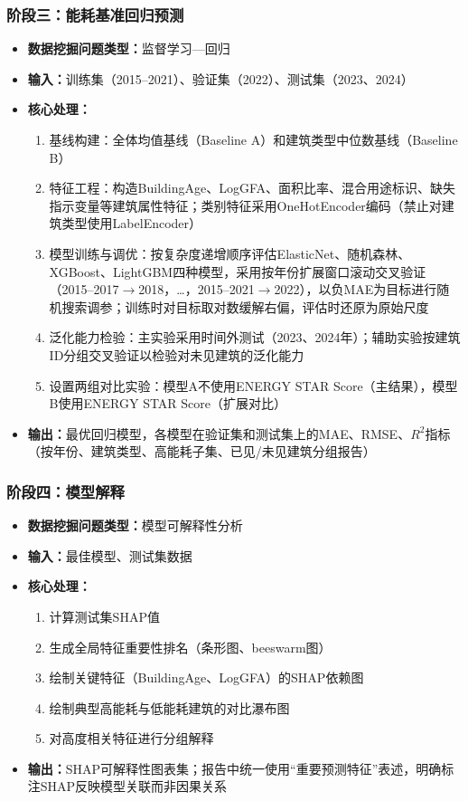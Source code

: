 \subsubsection{阶段三：能耗基准回归预测}

\begin{itemize}
    \item \textbf{数据挖掘问题类型：}监督学习—回归
    \item \textbf{输入：}训练集（2015--2021）、验证集（2022）、测试集（2023、2024）
    \item \textbf{核心处理：}
    \begin{enumerate}
        \item 基线构建：全体均值基线（Baseline A）和建筑类型中位数基线（Baseline B）
        \item 特征工程：构造BuildingAge、LogGFA、面积比率、混合用途标识、缺失指示变量等建筑属性特征；类别特征采用OneHotEncoder编码（禁止对建筑类型使用LabelEncoder）
        \item 模型训练与调优：按复杂度递增顺序评估ElasticNet、随机森林、XGBoost、LightGBM四种模型，采用按年份扩展窗口滚动交叉验证（2015--2017$\rightarrow$2018，\ldots，2015--2021$\rightarrow$2022），以负MAE为目标进行随机搜索调参；训练时对目标取对数缓解右偏，评估时还原为原始尺度
        \item 泛化能力检验：主实验采用时间外测试（2023、2024年）；辅助实验按建筑ID分组交叉验证以检验对未见建筑的泛化能力
        \item 设置两组对比实验：模型A不使用ENERGY STAR Score（主结果），模型B使用ENERGY STAR Score（扩展对比）
    \end{enumerate}
    \item \textbf{输出：}最优回归模型，各模型在验证集和测试集上的MAE、RMSE、$R^2$指标（按年份、建筑类型、高能耗子集、已见/未见建筑分组报告）
\end{itemize}

\subsubsection{阶段四：模型解释}

\begin{itemize}
    \item \textbf{数据挖掘问题类型：}模型可解释性分析
    \item \textbf{输入：}最佳模型、测试集数据
    \item \textbf{核心处理：}
    \begin{enumerate}
        \item 计算测试集SHAP值
        \item 生成全局特征重要性排名（条形图、beeswarm图）
        \item 绘制关键特征（BuildingAge、LogGFA）的SHAP依赖图
        \item 绘制典型高能耗与低能耗建筑的对比瀑布图
        \item 对高度相关特征进行分组解释
    \end{enumerate}
    \item \textbf{输出：}SHAP可解释性图表集；报告中统一使用``重要预测特征''表述，明确标注SHAP反映模型关联而非因果关系
\end{itemize}

